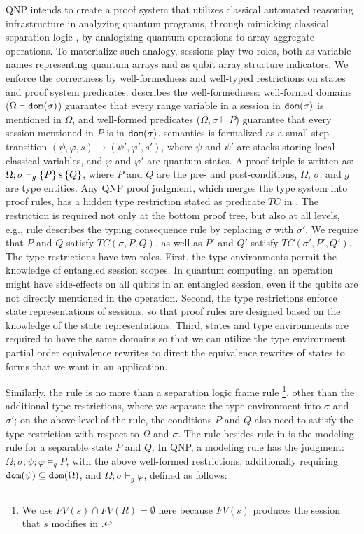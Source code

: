 QNP intends to create a proof system that utilizes classical automated reasoning infrastructure in analyzing quantum programs, through mimicking classical separation logic \cite{separationlogic}, by analogizing quantum operations to array aggregate operations.
To materialize such analogy, \qafny sessions play two roles, both as variable names representing quantum arrays and as qubit array structure indicators. We enforce the correctness by well-formedness and well-typed restrictions on states and proof system predicates.
 describes the well-formedness: well-formed domains ($\Omega\vdash \mathtt{dom}(\sigma)$) guarantee that every range variable in a session in $\mathtt{dom}(\sigma)$ is mentioned in $\Omega$, and well-formed predicates ($\Omega,\sigma \vdash P$) guarantee that every session mentioned in $P$ is in $\mathtt{dom}(\sigma)$.
\qafny semantics is formalized as a small-step transition $(\psi,\varphi,s) \longrightarrow (\psi',\varphi',s')$, where $\psi$ and $\psi'$ are stacks storing local classical variables, and $\varphi$ and $\varphi'$ are quantum states. A \qafny proof triple is written as: $\Omega;\sigma\vdash_{g}\{P\}\, s \,\{Q\}$, where $P$ and $Q$ are the pre- and post-conditions, $\Omega$, $\sigma$, and $g$ are type entities. Any QNP proof judgment, which merges the \qafny type system into proof rules, has a hidden type restriction stated as predicate $TC$ in .
The restriction is required not only at the bottom proof tree, but also at all levels, e.g., rule  describes the typing consequence rule by replacing $\sigma$ with $\sigma'$. We require that $P$ and $Q$ satisfy $TC(\sigma,P,Q)$, as well as $P'$ and $Q'$ satisfy $TC(\sigma',P',Q')$.
The type restrictions have two roles. First, the type environments permit the knowledge of entangled session scopes. In quantum computing, an operation might have side-effects on all qubits in an entangled session, even if the qubits are not directly mentioned in the operation. Second, the type restrictions enforce state representations of sessions, so that proof rules are designed based on the knowledge of the state representations. Third, states and type environments are required to have the same domains so that we can utilize the type environment partial order equivalence rewrites to direct the equivalence rewrites of states to forms that we want in an application.

Similarly, the  rule is no more than a separation logic frame rule \footnote{We use $FV(s)\cap FV(R)=\emptyset$ here because $FV(s)$ produces the session that $s$ modifies in \qafny. }, other than the additional type restrictions, where we separate the type environment into $\sigma$ and $\sigma'$; on the above level of the  rule, the conditions $P$ and $Q$ also need to satisfy the type restriction with respect to $\Omega$ and $\sigma$.
The rule besides rule  in  is the modeling rule for a separable state $P$ and $Q$.
In QNP, a modeling rule has the judgment: $\Omega;\sigma;\psi;\varphi\models_g P$, with the above well-formed restrictions, additionally requiring $\mathtt{dom}(\psi) \subseteq \mathtt{dom}(\Omega)$, and $\Omega;\sigma\vdash_g \varphi$, defined as follows:

